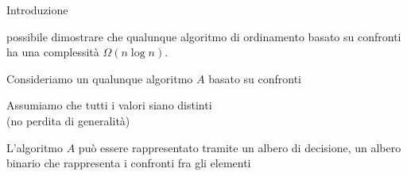 \begin{frame}{Introduzione}

\vspace{-9pt}
\begin{myboxtitle}
\EE possibile dimostrare che qualunque algoritmo di ordinamento \alert{basato su confronti} ha una complessità 
$\Omega(n \log n)$.
\end{myboxtitle}

\begin{myboxtitle}[Assunzioni]
\BI
\item Consideriamo un qualunque algoritmo $A$ basato su confronti
\item Assumiamo che tutti i valori siano distinti\\ (no perdita di generalità)
\item L'algoritmo $A$  può essere rappresentato tramite un \alert{albero di decisione}, un albero binario che rappresenta i confronti fra gli elementi
\EI
\end{myboxtitle}

\end{frame}%

